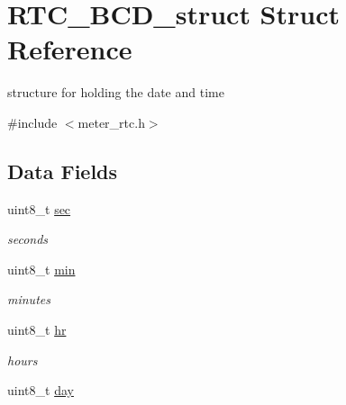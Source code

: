 \hypertarget{struct_r_t_c___b_c_d__struct}{\section{R\-T\-C\-\_\-\-B\-C\-D\-\_\-struct Struct Reference}
\label{struct_r_t_c___b_c_d__struct}
}


structure for holding the date and time  




{\ttfamily \#include $<$meter\-\_\-rtc.\-h$>$}

\subsection*{Data Fields}
\begin{DoxyCompactItemize}
\item 
\hypertarget{struct_r_t_c___b_c_d__struct_ad1696900026b287a87c563b733a21bc3}{uint8\-\_\-t \hyperlink{struct_r_t_c___b_c_d__struct_ad1696900026b287a87c563b733a21bc3}{sec}}\label{struct_r_t_c___b_c_d__struct_ad1696900026b287a87c563b733a21bc3}

\begin{DoxyCompactList}\small\item\em seconds \end{DoxyCompactList}\item 
\hypertarget{struct_r_t_c___b_c_d__struct_ac9b481208b43f7c37ed25e446bdec692}{uint8\-\_\-t \hyperlink{struct_r_t_c___b_c_d__struct_ac9b481208b43f7c37ed25e446bdec692}{min}}\label{struct_r_t_c___b_c_d__struct_ac9b481208b43f7c37ed25e446bdec692}

\begin{DoxyCompactList}\small\item\em minutes \end{DoxyCompactList}\item 
\hypertarget{struct_r_t_c___b_c_d__struct_af81497bba948ed53ee254cac82d9f40f}{uint8\-\_\-t \hyperlink{struct_r_t_c___b_c_d__struct_af81497bba948ed53ee254cac82d9f40f}{hr}}\label{struct_r_t_c___b_c_d__struct_af81497bba948ed53ee254cac82d9f40f}

\begin{DoxyCompactList}\small\item\em hours \end{DoxyCompactList}\item 
\hypertarget{struct_r_t_c___b_c_d__struct_a72369a1087b2aeffe374bb054cb97c12}{uint8\-\_\-t \hyperlink{struct_r_t_c___b_c_d__struct_a72369a1087b2aeffe374bb054cb97c12}{day}}\label{struct_r_t_c___b_c_d__struct_a72369a1087b2aeffe374bb054cb97c12}


\end{DoxyCompactItemize}
